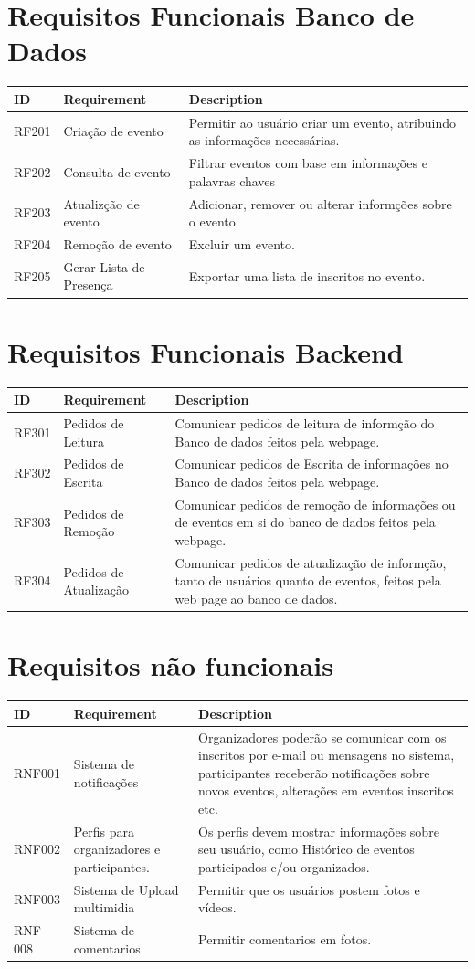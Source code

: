 \section{Requisitos Funcionais Banco de Dados}
\begin{tabular}{>{\raggedright}p{1.5cm}>{\raggedright}p{4cm}>{\raggedright}p{10cm}}
\toprule
\textbf{ID} & \textbf{Requirement} & \textbf{Description} \tabularnewline 
\midrule
  RF201 & Criação de evento & Permitir ao usuário criar um evento, atribuindo as informações necessárias.\tabularnewline \hline
  RF202 & Consulta de evento & Filtrar eventos com base em informações e palavras chaves\tabularnewline \hline
  RF203 & Atualizção de evento & Adicionar, remover ou alterar informções sobre o evento.\tabularnewline \hline
  RF204 & Remoção de evento & Excluir um evento.\tabularnewline \hline
  RF205 & Gerar Lista de Presença & Exportar uma lista de inscritos no evento.\tabularnewline 
\bottomrule
\end{tabular}

\section{Requisitos Funcionais Backend}

\begin{tabular}{>{\raggedright}p{1.5cm}>{\raggedright}p{4cm}>{\raggedright}p{10cm}}
\toprule
\textbf{ID} & \textbf{Requirement} & \textbf{Description} \tabularnewline 
\midrule
  RF301 & Pedidos de Leitura & Comunicar pedidos de leitura de informção do Banco de dados feitos pela webpage. \tabularnewline \hline
  RF302 & Pedidos de Escrita & Comunicar pedidos de Escrita de informações no Banco de dados feitos pela webpage.\tabularnewline \hline
  RF303 & Pedidos de Remoção & Comunicar pedidos de remoção de informações ou de eventos em si do banco de dados feitos pela webpage.\tabularnewline \hline
  RF304 & Pedidos de Atualização & Comunicar pedidos de atualização de informção, tanto de usuários quanto de eventos, feitos pela web page ao banco de dados.\tabularnewline 
\bottomrule
\end{tabular}


\section{Requisitos não funcionais}
\begin{tabular}{>{\raggedright}p{1.5cm}>{\raggedright}p{4cm}>{\raggedright}p{10cm}}
\toprule
\textbf{ID} & \textbf{Requirement} & \textbf{Description} \tabularnewline 
\midrule
RNF001 & Sistema de notificações & Organizadores poderão se comunicar com os inscritos por e-mail ou mensagens no sistema, participantes receberão notiﬁcações sobre novos eventos, alterações em eventos inscritos etc. \tabularnewline \hline
RNF002 & Perﬁs para organizadores e participantes. & Os perfis devem mostrar informações sobre seu usuário, como Histórico de eventos participados e/ou organizados. \tabularnewline \hline
RNF003 & Sistema de Upload multimidia & Permitir que os usuários postem fotos e vídeos. \tabularnewline \hline 
RNF-008 & Sistema de comentarios & Permitir comentarios em fotos.\tabularnewline

\bottomrule
\end{tabular}



